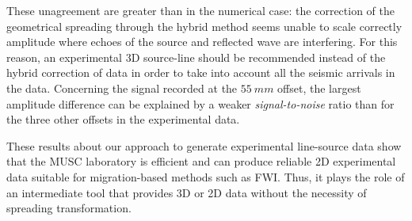 \documentclass[manuscript,revised]{geophysics}
\begin{document}

\noindent These unagreement are greater than in the numerical case: the correction of the geometrical spreading through the hybrid method seems unable to scale correctly amplitude where echoes of the source and reflected wave are interfering. For this reason, an experimental 3D source-line should be recommended instead of the hybrid correction of data in order to take into account all the seismic arrivals in the data.  Concerning the signal recorded at the $55\ mm$ offset, the largest amplitude difference can be explained by a weaker \textit{signal-to-noise} ratio than for the three other offsets in the experimental data.  

\noindent These results about our approach to generate experimental line-source data show that the MUSC laboratory is efficient and can produce reliable 2D experimental data suitable for migration-based methods such as FWI. Thus, it plays the role of an intermediate tool that provides 3D or 2D data without the necessity of spreading transformation.
\end{document}
